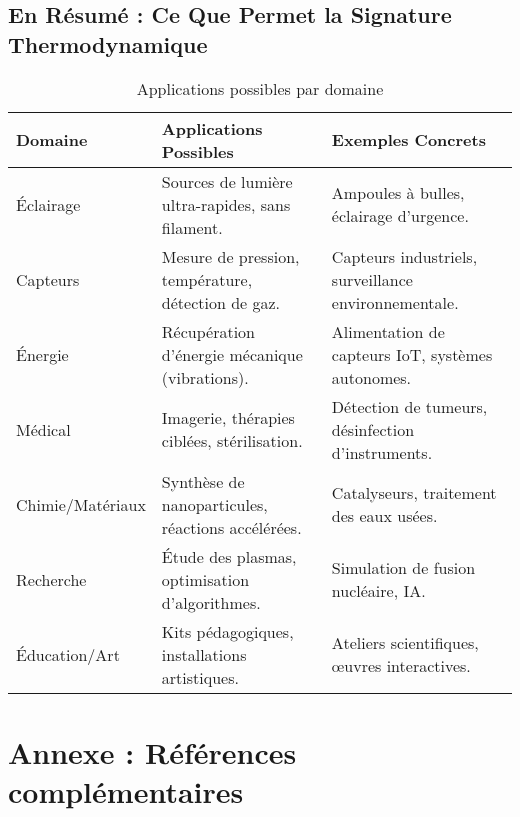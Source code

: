 \documentclass[a4paper,12pt]{article}
\begin{document}
\subsection*{En Résumé : Ce Que Permet la Signature Thermodynamique}
\begin{table}[h]
\centering
\caption{Applications possibles par domaine}
\begin{tabular}{|p{3cm}|p{5cm}|p{5cm}|}
\hline
\textbf{Domaine} & \textbf{Applications Possibles} & \textbf{Exemples Concrets} \\ \hline
Éclairage & Sources de lumière ultra-rapides, sans filament. & Ampoules à bulles, éclairage d’urgence. \\ \hline
Capteurs & Mesure de pression, température, détection de gaz. & Capteurs industriels, surveillance environnementale. \\ \hline
Énergie & Récupération d’énergie mécanique (vibrations). & Alimentation de capteurs IoT, systèmes autonomes. \\ \hline
Médical & Imagerie, thérapies ciblées, stérilisation. & Détection de tumeurs, désinfection d’instruments. \\ \hline
Chimie/Matériaux & Synthèse de nanoparticules, réactions accélérées. & Catalyseurs, traitement des eaux usées. \\ \hline
Recherche & Étude des plasmas, optimisation d’algorithmes. & Simulation de fusion nucléaire, IA. \\ \hline
Éducation/Art & Kits pédagogiques, installations artistiques. & Ateliers scientifiques, œuvres interactives. \\ \hline
\end{tabular}
\end{table}

\newpage
\section*{Annexe : Références complémentaires}
\end{document}
